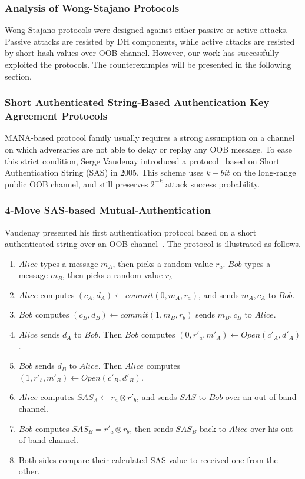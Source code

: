 \subsubsection*{Analysis of Wong-Stajano Protocols}

Wong-Stajano protocols were designed against either passive or active attacks. Passive attacks are resisted by DH components, while active attacks are resisted by short hash values over OOB channel. However, our work has successfully exploited the protocols. The counterexamples will be presented in the following section. 

\subsubsection{Short Authenticated String-Based Authentication Key Agreement Protocols}

MANA-based protocol family usually requires a strong assumption on a channel on which adversaries are not able to delay or replay any OOB message. To ease this strict condition, Serge Vaudenay introduced a protocol~\cite{Vaudenay:2005qa} based on Short Authentication String (SAS) in 2005. This scheme uses $k-bit$ on the long-range public OOB channel, and still preserves $2^{-k}$ attack success probability.

\subsubsection*{4-Move SAS-based Mutual-Authentication}

Vaudenay presented his first authentication protocol based on a short authenticated string over an OOB channel~\cite{Vaudenay:2005qa}. The protocol is illustrated as follows.

\begin{enumerate}
\item $Alice$ types a message $m_A$, then picks a random value $r_a$. $Bob$ types a message $m_B$, then picks a random value $r_b$
\item $Alice$ computes $(c_A,d_A) \leftarrow commit(0,m_A,r_a)$, and sends $m_A, c_A$ to $Bob$.
\item $Bob$ computes $(c_B,d_B) \leftarrow commit(1,m_B,r_b)$ sends $m_B, c_B$ to $Alice$.
\item $Alice$ sends $d_A$ to $Bob$. Then $Bob$ computes $(0,r'_a,m'_A) \leftarrow Open(c'_A,d'_A)$. 
\item $Bob$ sends $d_B$ to $Alice$. Then $Alice$ computes $(1,r'_b,m'_B) \leftarrow Open(c'_B,d'_B)$. 
\item $Alice$ computes $SAS_A \leftarrow r_a \otimes r'_b$, and sends $SAS$ to $Bob$ over an out-of-band channel. 
\item $Bob$ computes $SAS_B = r'_a \otimes r_b$, then sends $SAS_B$ back to $Alice$ over his out-of-band channel. 
\item Both sides compare their calculated SAS value to received one from the other. 
\end{enumerate}

